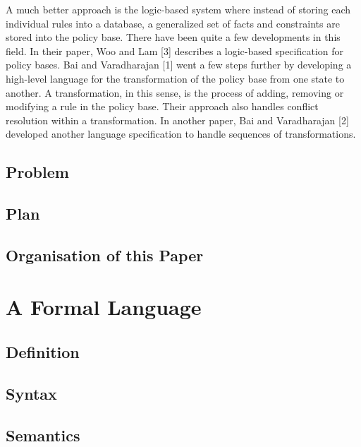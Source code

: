 \documentclass[a4paper]{article}
\begin{document}
      A much better approach is the logic-based system where instead of
      storing each individual rules into a database, a generalized set of
      facts and constraints are stored into the policy base. There have been
      quite a few developments in this field. In their paper, Woo and Lam [3]
      describes a logic-based specification for policy bases. Bai and
      Varadharajan [1] went a few steps further by developing a high-level
      language for the transformation of the policy base from one state to
      another. A transformation, in this sense, is the process of adding,
      removing or modifying a rule in the policy base. Their approach also
      handles conflict resolution within a transformation. In another paper,
      Bai and Varadharajan [2] developed another language specification to
      handle sequences of transformations.

    \subsection{Problem}

    \subsection{Plan}

    \subsection{Organisation of this Paper}

    \pagebreak

  \section{A Formal Language}

    \subsection{Definition}

    \subsection{Syntax}

    \subsection{Semantics}

    \pagebreak
\end{document}
